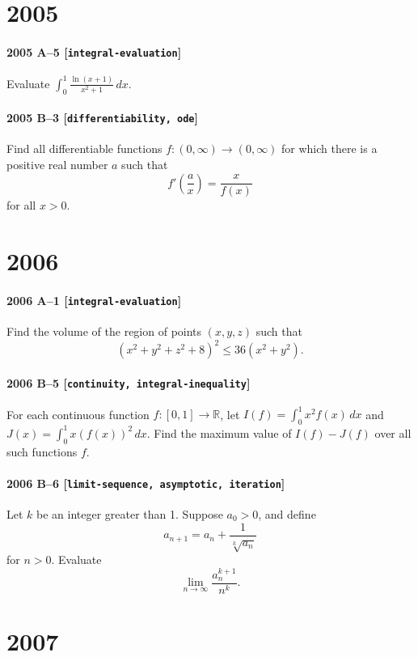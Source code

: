 \documentclass[11pt]{article}
\begin{document}
\section*{2005}

\paragraph{2005 A--5 \textnormal{[\texttt{integral-evaluation}]}}
Evaluate $\int_0^1 \frac{\ln(x+1)}{x^2+1}\,dx$.

\paragraph{2005 B--3 \textnormal{[\texttt{differentiability, ode}]}}
Find all differentiable functions $f: (0, \infty) \to (0, \infty)$ for which
there is a positive real number $a$ such that
\[
f' \left( \frac{a}{x} \right) = \frac{x}{f(x)}
\]
for all $x > 0$.

\section*{2006}

\paragraph{2006 A--1 \textnormal{[\texttt{integral-evaluation}]}}
Find the volume of the region of points $(x,y,z)$ such that
\[
(x^2 + y^2 + z^2 + 8)^2 \leq 36(x^2 + y^2).
\]

\paragraph{2006 B--5 \textnormal{[\texttt{continuity, integral-inequality}]}}
For each continuous function $f: [0,1] \to \mathbb{R}$, let $I(f) =
\int_0^1 x^2 f(x)\,dx$ and $J(x) = \int_0^1 x \left(f(x)\right)^2\,dx$.
Find the maximum value of $I(f) - J(f)$ over all such functions $f$.

\paragraph{2006 B--6 \textnormal{[\texttt{limit-sequence, asymptotic, iteration}]}}
Let $k$ be an integer greater than 1. Suppose $a_0 > 0$, and define
\[
a_{n+1} = a_n + \frac{1}{\sqrt[k]{a_n}}
\]
for $n > 0$. Evaluate
\[
\lim_{n \to \infty} \frac{a_n^{k+1}}{n^k}.
\]

\section*{2007}
\end{document}
